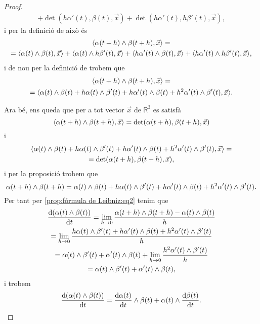 \documentclass[../../Main.tex]{subfiles}
\begin{document}
\begin{proposition}
\begin{proof}
\begin{multline*}
				+\det(h\alpha'(t),\beta(t),\vec{x})+\det(h\alpha'(t),h\beta'(t),\vec{x}),
			\end{multline*}
			i per la definició de  això és
			\begin{multline*}
				\prodesc{\alpha(t+h)\prodvec\beta(t+h)}{\vec{x}}=\\
				=\prodesc{\alpha(t)\prodvec\beta(t)}{\vec{x}}+\prodesc{\alpha(t)\prodvec h\beta'(t)}{\vec{x}}+\prodesc{h\alpha'(t)\prodvec\beta(t)}{\vec{x}}+\prodesc{h\alpha'(t)\prodvec h\beta'(t)}{\vec{x}},
			\end{multline*}
			i de nou per la definició de  trobem que
			\begin{multline*}
				\prodesc{\alpha(t+h)\prodvec\beta(t+h)}{\vec{x}}=\\
				=\prodesc{\alpha(t)\prodvec\beta(t)+h\alpha(t)\prodvec\beta'(t)+h\alpha'(t)\prodvec\beta(t)+h^{2}\alpha'(t)\prodvec \beta'(t)}{\vec{x}}.
			\end{multline*}
			
			Ara bé, ens queda que per a tot vector \(\vec{x}\) de \(\mathbb{R}^{3}\) es satisfà
			\[
			    \prodesc{\alpha(t+h)\prodvec\beta(t+h)}{\vec{x}}=\det(\alpha(t+h),\beta(t+h),\vec{x})
			\]
			i
			\begin{multline*}
				\prodesc{\alpha(t)\prodvec\beta(t)+h\alpha(t)\prodvec\beta'(t)+h\alpha'(t)\prodvec\beta(t)+h^{2}\alpha'(t)\prodvec \beta'(t)}{\vec{x}}=\\=\det(\alpha(t+h),\beta(t+h),\vec{x}),
			\end{multline*}
			i per la proposició  trobem que
			\[
			    \alpha(t+h)\mathbin{\wedge}\beta(t+h)=\alpha(t)\mathbin{\wedge}\beta(t)+h\alpha(t)\mathbin{\wedge}\beta'(t)+h\alpha'(t)\mathbin{\wedge}\beta(t)+h^{2}\alpha'(t)\mathbin{\wedge} \beta'(t).
			\]
			Per tant per \eqref{prop:fórmula de Leibniz:eq2} tenim que
			\begin{multline*}
				\frac{\mathop{}\!\mathrm{d}(\alpha(t)\mathbin{\wedge}\beta(t))}{\mathop{}\!\mathrm{d} t}=\lim_{h\to0}\frac{\alpha(t+h)\mathbin{\wedge}\beta(t+h)-\alpha(t)\mathbin{\wedge}\beta(t)}{h}\\
				=\lim_{h\to0}\frac{h\alpha(t)\mathbin{\wedge}\beta'(t)+h\alpha'(t)\mathbin{\wedge}\beta(t)+h^{2}\alpha'(t)\mathbin{\wedge} \beta'(t)}{h}\\
				=\alpha(t)\mathbin{\wedge}\beta'(t)+\alpha'(t)\mathbin{\wedge}\beta(t)+\lim_{h\to0}\frac{h^{2}\alpha'(t)\mathbin{\wedge} \beta'(t)}{h}\\
				=\alpha(t)\mathbin{\wedge}\beta'(t)+\alpha'(t)\mathbin{\wedge}\beta(t),
			\end{multline*}
			i trobem
			\[
			    \frac{\mathop{}\!\mathrm{d}(\alpha(t)\mathbin{\wedge}\beta(t))}{\mathop{}\!\mathrm{d} t}=\frac{\mathop{}\!\mathrm{d}\alpha(t)}{\mathop{}\!\mathrm{d} t}\mathbin{\wedge}\beta(t)+\alpha(t)\mathbin{\wedge}\frac{\mathop{}\!\mathrm{d}\beta(t)}{\mathop{}\!\mathrm{d} t}.\qedhere
			\]
		\end{proof}
	\end{proposition}
\end{document}
